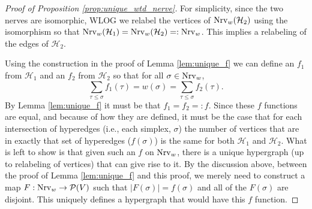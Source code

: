 \documentclass{amsart}
\renewcommand{\H}{\mathcal{H}}
\newcommand{\po}{\mathcal{P}}
\newcommand{\Nrv}{\mm{\mathrm{Nrv}}}
\newcommand {\mm}[1]        {\ifmmode{#1}\else{\mbox{\(#1\)}}\fi}
\begin{document}
\begin{proof}[Proof of Proposition \ref{prop:unique_wtd_nerve}]
    For simplicity, since the two nerves are isomorphic, WLOG we relabel the vertices of $\Nrv_w(\H_2)$ using the isomorphism so that $\Nrv_w(\H_1) = \Nrv_w(\H_2) =:\Nrv_w$. This implies a relabeling of the edges of $\H_2$.
    
    Using the construction in the proof of Lemma \ref{lem:unique_f} we can define an $f_1$ from $\H_1$ and an $f_2$ from $\H_2$ so that for all $\sigma \in \Nrv_w$,
    \[ \sum_{\tau \leq \sigma} f_1(\tau) = w(\sigma) = \sum_{\tau \leq \sigma} f_2(\tau).\]
    By Lemma \ref{lem:unique_f} it must be that $f_1 = f_2 =: f$. 
    Since these $f$ functions are equal, and because of how they are defined, it must be the case that for each intersection of hyperedges (i.e., each simplex, $\sigma$) the number of vertices that are in exactly that set of hyperedges ($f(\sigma)$) is the same for both $\H_1$ and $\H_2$. 
    What is left to show is that given such an $f$ on $\Nrv_w$, there is a unique hypergraph (up to relabeling of vertices) that can give rise to it.
    By the discussion above, between the proof of Lemma \ref{lem:unique_f} and this proof, we merely need to construct a map $F : \Nrv_w \rightarrow \po(V)$ such that $|F(\sigma)| = f(\sigma)$ and all of the $F(\sigma)$ are disjoint. This uniquely defines a hypergraph that would have this $f$ function.


\end{proof}
\end{document}
